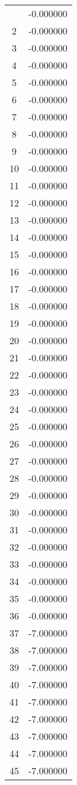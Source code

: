 \documentclass[12pt]{article}
\begin{document}
\begin{longtable}{@{}cc@{}}
\bottomrule
\endlastfoot
1 & -0.000000 \\
2 & -0.000000 \\
3 & -0.000000 \\
4 & -0.000000 \\
5 & -0.000000 \\
6 & -0.000000 \\
7 & -0.000000 \\
8 & -0.000000 \\
9 & -0.000000 \\
10 & -0.000000 \\
11 & -0.000000 \\
12 & -0.000000 \\
13 & -0.000000 \\
14 & -0.000000 \\
15 & -0.000000 \\
16 & -0.000000 \\
17 & -0.000000 \\
18 & -0.000000 \\
19 & -0.000000 \\
20 & -0.000000 \\
21 & -0.000000 \\
22 & -0.000000 \\
23 & -0.000000 \\
24 & -0.000000 \\
25 & -0.000000 \\
26 & -0.000000 \\
27 & -0.000000 \\
28 & -0.000000 \\
29 & -0.000000 \\
30 & -0.000000 \\
31 & -0.000000 \\
32 & -0.000000 \\
33 & -0.000000 \\
34 & -0.000000 \\
35 & -0.000000 \\
36 & -0.000000 \\
37 & -7.000000 \\
38 & -7.000000 \\
39 & -7.000000 \\
40 & -7.000000 \\
41 & -7.000000 \\
42 & -7.000000 \\
43 & -7.000000 \\
44 & -7.000000 \\
45 & -7.000000 \\

\end{longtable}
\end{document}
